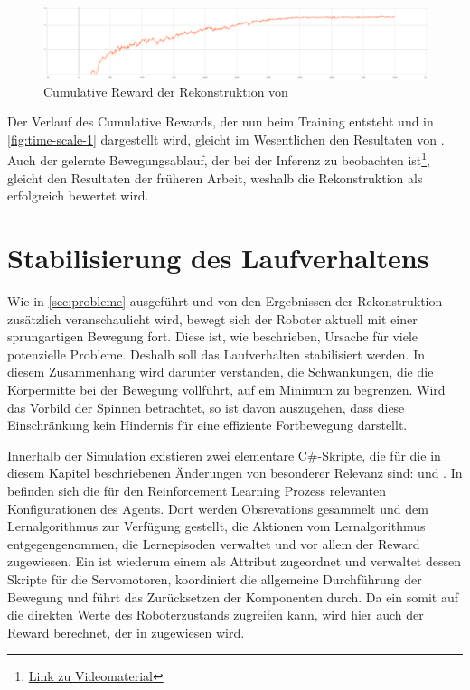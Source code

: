 \begin{figure}[H]
    \centering
    \includegraphics[width=\textwidth]{Bilder/ml-agents/Environment_Cumulative Reward_time-scale-1.pdf}
    \caption{Cumulative Reward der Rekonstruktion von \cite{waidner.2020}}
    \label{fig:time-scale-1}
\end{figure}

Der Verlauf des Cumulative Rewards, der nun beim Training entsteht und in \autoref{fig:time-scale-1} dargestellt wird, gleicht im Wesentlichen den Resultaten von \cite[50]{waidner.2020}.
Auch der gelernte Bewegungsablauf, der bei der Inferenz zu beobachten ist\footnote{\href{https://github.com/yschiebelhut/studienarbeit-doc/raw/master/Videos/SpiderBotDemos/timeScale1.webm}{Link zu Videomaterial}}, gleicht den Resultaten der früheren Arbeit, weshalb die Rekonstruktion als erfolgreich bewertet wird.


\section{Stabilisierung des Laufverhaltens}
Wie in \autoref{sec:probleme} ausgeführt und von den Ergebnissen der Rekonstruktion zusätzlich veranschaulicht wird, bewegt sich der Roboter aktuell mit einer sprungartigen Bewegung fort.
Diese ist, wie beschrieben, Ursache für viele potenzielle Probleme.
Deshalb soll das Laufverhalten stabilisiert werden.
In diesem Zusammenhang wird darunter verstanden, die Schwankungen, die die Körpermitte bei der Bewegung vollführt, auf ein Minimum zu begrenzen.
Wird das Vorbild der Spinnen betrachtet, so ist davon auszugehen, dass diese Einschränkung kein Hindernis für eine effiziente Fortbewegung darstellt.

Innerhalb der Simulation existieren zwei elementare C\#-Skripte, die für die in diesem Kapitel beschriebenen Änderungen von besonderer Relevanz sind:  und .
In  befinden sich die für den Reinforcement Learning Prozess relevanten Konfigurationen des Agents.
Dort werden Obsrevations gesammelt und dem Lernalgorithmus zur Verfügung gestellt, die Aktionen vom Lernalgorithmus entgegengenommen, die Lernepisoden verwaltet und vor allem der Reward zugewiesen.
Ein  ist wiederum einem  als Attribut zugeordnet und verwaltet dessen Skripte für die Servomotoren, koordiniert die allgemeine Durchführung der Bewegung und führt das Zurücksetzen der Komponenten durch.
Da ein  somit auf die direkten Werte des Roboterzustands zugreifen kann, wird hier auch der Reward berechnet, der in  zugewiesen wird.


